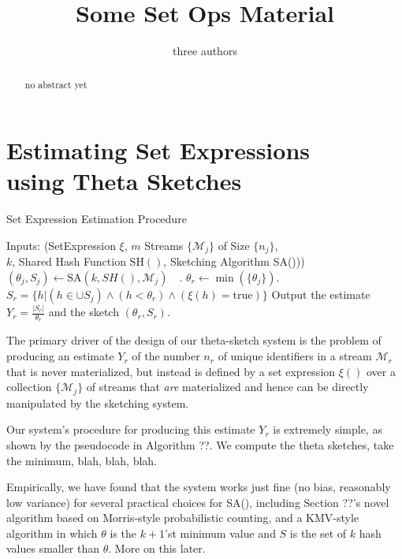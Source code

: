 \documentclass{sig-alternate}
\begin{document}

\title{Some Set Ops Material}

\author{three authors}

\maketitle
\begin{abstract}
no abstract yet
\end{abstract}


\section{Estimating Set Expressions \\ using Theta Sketches}

\begin{algorithm}[t]
\caption{Set Expression Estimation Procedure}
\label{alg:set-expr-algorithm}
\begin{algorithmic}[1]{\footnotesize
\STATE Inputs: (SetExpression $\xi$, $m$ Streams $\{\mathcal{M}_j\}$ of Size $\{n_j\}$, \\
                $k$, Shared Hash Function $\mathrm{SH}()$, Sketching Algorithm SA()))
\STATE  $(\theta_j, S_j) \leftarrow \mathrm{SA}(k,SH(),\mathcal{M}_j) \quad$. %
\ENDFOR
\STATE $\theta_r \leftarrow \min (\{\theta_j\})$.
\STATE $S_r = \{h | (h \in \cup S_j) \wedge (h < \theta_r) \wedge (\xi(h) = \mathrm{true})\}$
\STATE Output the estimate $Y_r = \frac{|S_r|}{\theta_r}$ and the sketch $(\theta_r, S_r)$.
}\end{algorithmic}
\end{algorithm}

The primary driver of the design of our theta-sketch system is the
problem of producing an estimate $Y_r$ of the number $n_r$ of unique
identifiers in a stream $\mathcal{M}_r$ that is never materialized,
but instead is defined by a set expression $\xi()$ over a collection
$\{\mathcal{M}_j\}$ of streams that {\em are} materialized and hence can be
directly manipulated by the sketching system.

Our system's procedure for producing this estimate $Y_r$ is extremely simple, as shown by
the pseudocode in Algorithm ??. We compute the theta sketches, take the minimum, blah, blah, blah.

Empirically, we have found that the system works just fine (no bias,
reasonably low variance) for several practical choices for SA(),
including Section ??'s novel algorithm based on Morris-style
probabilistic counting, and a KMV-style algorithm in which $\theta$ is
the $k+1$'st minimum value and $S$ is the set of $k$ hash values
smaller than $\theta$.  More on this later.
\end{document}
